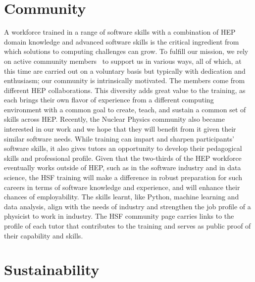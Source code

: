 \documentclass[twocolumn]{svjour3}          %
\begin{document}
\section{Community}\label{sec:Community}
%
A workforce trained in a range of software skills with a combination of HEP domain knowledge and advanced software skills is the critical ingredient from which solutions to computing challenges can grow. To fulfill our mission, we rely on active community members~\cite{HSF-training-community} to support us in various ways, all of which, at this time are carried out on a voluntary basis but typically with dedication and enthusiasm; our community is intrinsically motivated. The members come from different HEP collaborations. This diversity adds great value to the training, as each brings their own flavor of experience from a different computing environment with a common goal to create, teach, and sustain a common set of skills across HEP. Recently, the Nuclear Physics community also became interested in our work and we hope that they will benefit from it given their similar software needs.  While training can impart and sharpen participants' software skills, it also gives tutors an opportunity to develop their pedagogical skills and professional profile. Given that the two-thirds of the HEP workforce eventually works outside of HEP, such as in the software industry and in data science, the HSF training will make a difference in robust preparation for such careers in terms of software knowledge and experience, and will enhance their chances of employability. The skills learnt, like Python, machine learning and data analysis, align with the needs of industry and strengthen the job profile of a physicist to work in industry.  The HSF community page carries links to the profile of each tutor that contributes to the training and serves as public proof of their capability and skills.


\section{Sustainability}\label{sec:Sustainability}
\end{document}
